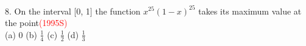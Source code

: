 \documentclass[journal,12pt,twocolumn]{IEEEtran}
\theoremstyle{remark}
\begin{document}
8.  On the interval [0, 1] the function $x^{25}(1-x)^{25}$ \indent takes its maximum value at the point\hspace{0.7cm}\textcolor{red}{(1995S)}\\[2pt]\indent (a)\hspace{0.2cm} 0\hspace{0.9cm} (b)\hspace{0.2cm} $\displaystyle\frac{1}{4}$\hspace{0.9cm} (c)\hspace{0.2cm} $\displaystyle\frac{1}{2}$\hspace{0.9cm} (d)\hspace{0.2cm} $\displaystyle\frac{1}{3}$
    
\newpage
\bigskip

\renewcommand{\thefigure}{\theenumi}
\renewcommand{\thetable}{\theenumi}
\end{document}
